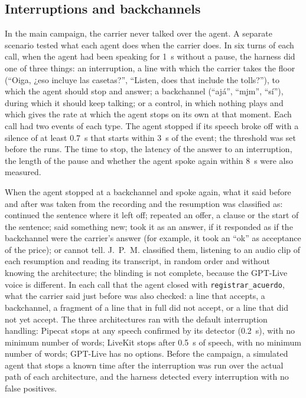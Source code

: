 \documentclass[11pt]{article}
\begin{document}
\subsection{Interruptions and backchannels}\label{sec:met-interr}

In the main campaign, the carrier never talked over the agent. A separate scenario tested what each agent does when the carrier does. In six turns of each call, when the agent had been speaking for 1~s without a pause, the harness did one of three things: an
interruption, a line with which the carrier takes the floor (``Oiga, ¿eso
incluye las casetas?'', ``Listen, does that include the tolls?''), to which the agent
should stop and answer; a backchannel (``ajá'', ``mjm'', ``sí''), during which
it should keep talking; or a control, in which nothing plays and which gives
the rate at which the agent stops on its own at that moment. Each call had two events of each type. The agent stopped if its speech broke off with a silence of at
least 0.7~s that starts within 3~s of the event; the threshold was set before the
runs. The time to stop, the latency of the answer to an interruption, the length of
the pause and whether the agent spoke again within 8~s were also measured.

When the agent stopped at a backchannel and spoke again, what it said before and after
was taken from the recording and the resumption was classified as: continued
the sentence where it left off; repeated an offer, a clause or the start of the
sentence; said something new; took it as an answer, if it responded as if
the backchannel were the carrier's answer (for example, it took an ``ok'' as
acceptance of the price); or cannot tell. J.~P.~M. classified them, listening
to an audio clip of each resumption and reading its transcript, in random order and
without knowing the architecture; the blinding is not complete, because the GPT-Live voice is different.
In each call that the agent closed with \texttt{registrar\_acuerdo}, what the carrier
said just before was also checked: a line that accepts, a backchannel, a fragment of
a line that in full did not accept, or a line that did not yet accept. The three architectures
ran with the default interruption handling: Pipecat stops at any speech confirmed by
its detector (0.2~s), with no minimum number of words; LiveKit stops after 0.5~s of
speech, with no minimum number of words; GPT-Live has no options. Before the campaign,
a simulated agent that stops a known time after the interruption was run over the
actual path of each architecture, and the harness detected every interruption with no false
positives.
\end{document}
